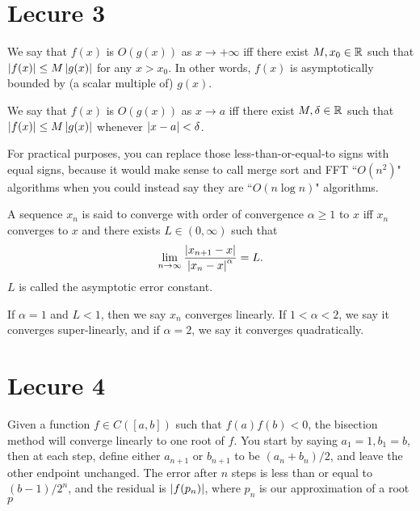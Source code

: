 \documentclass{article}
\begin{document}
\section{Lecure 3}
We say that $f(x)$ is $O(g(x))$ as $x \rightarrow +\infty$ iff there exist $M, x_0 \in \mathbb{R}$ such that $\left\lvert f(x) \right\rvert \leq M \left\lvert g(x) \right\rvert$ for any $x > x_0$. In other words, $f(x)$ is asymptotically bounded by (a scalar multiple of) $g(x)$.
\par
We say that $f(x)$ is $O(g(x))$ as $x \rightarrow a$ iff there exist $M, \delta \in \mathbb{R}$ such that $\left\lvert f(x) \right\rvert \leq M \left\lvert g(x) \right\rvert$ whenever $\left\lvert x-a \right\rvert<\delta$.
\par
For practical purposes, you can replace those less-than-or-equal-to signs with equal signs, because it would make sense to call merge sort and FFT ``$O(n^2)$" algorithms when you could instead say they are ``$O(n \log n)$" algorithms.
\par
A sequence $x_n$ is said to converge with order of convergence $\alpha \geq 1$ to $x$ iff $x_n$ converges to $x$ and there exists $L \in (0, \infty)$ such that
\[ \lim_{n \rightarrow \infty} \frac{\left\lvert x_{n+1}-x \right\rvert}{\left\lvert x_n-x \right\rvert^\alpha} = L.\]
$L$ is called the asymptotic error constant.
\par
If $\alpha=1$ and $L<1$, then we say $x_n$ converges linearly. If $1 < \alpha < 2$, we say it converges super-linearly, and if $\alpha=2$, we say it converges quadratically.

\section{Lecure 4}
Given a function $f \in C([a,b])$ such that $f(a)f(b)<0$, the bisection method will converge linearly to one root of $f$. You start by saying $a_1=1, b_1=b$, then at each step, define either $a_{n+1}$ or $b_{n+1}$ to be $(a_n+b_n)/2$, and leave the other endpoint unchanged. The error after $n$ steps is less than or equal to $(b-1)/2^n$, and the residual is $\left\lvert f(p_n) \right\rvert$, where $p_n$ is our approximation of a root $p$
\end{document}
